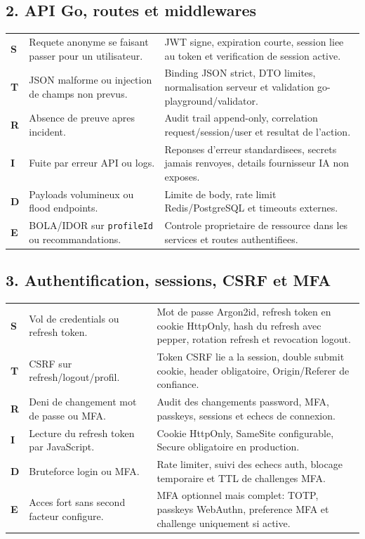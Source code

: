 \documentclass[10pt,a4paper]{article}
\begin{document}
\subsection{2. API Go, routes et middlewares}
\begin{tabularx}{\textwidth}{@{}L{1.6cm}L{4.2cm}Y@{}}
\toprule
\textbf{S} & Requete anonyme se faisant passer pour un utilisateur. & JWT signe, expiration courte, session liee au token et verification de session active. \\
\textbf{T} & JSON malforme ou injection de champs non prevus. & Binding JSON strict, DTO limites, normalisation serveur et validation go-playground/validator. \\
\textbf{R} & Absence de preuve apres incident. & Audit trail append-only, correlation request/session/user et resultat de l'action. \\
\textbf{I} & Fuite par erreur API ou logs. & Reponses d'erreur standardisees, secrets jamais renvoyes, details fournisseur IA non exposes. \\
\textbf{D} & Payloads volumineux ou flood endpoints. & Limite de body, rate limit Redis/PostgreSQL et timeouts externes. \\
\textbf{E} & BOLA/IDOR sur \texttt{profileId} ou recommandations. & Controle proprietaire de ressource dans les services et routes authentifiees. \\
\bottomrule
\end{tabularx}

\subsection{3. Authentification, sessions, CSRF et MFA}
\begin{tabularx}{\textwidth}{@{}L{1.6cm}L{4.2cm}Y@{}}
\toprule
\textbf{S} & Vol de credentials ou refresh token. & Mot de passe Argon2id, refresh token en cookie HttpOnly, hash du refresh avec pepper, rotation refresh et revocation logout. \\
\textbf{T} & CSRF sur refresh/logout/profil. & Token CSRF lie a la session, double submit cookie, header obligatoire, Origin/Referer de confiance. \\
\textbf{R} & Deni de changement mot de passe ou MFA. & Audit des changements password, MFA, passkeys, sessions et echecs de connexion. \\
\textbf{I} & Lecture du refresh token par JavaScript. & Cookie HttpOnly, SameSite configurable, Secure obligatoire en production. \\
\textbf{D} & Bruteforce login ou MFA. & Rate limiter, suivi des echecs auth, blocage temporaire et TTL de challenges MFA. \\
\textbf{E} & Acces fort sans second facteur configure. & MFA optionnel mais complet: TOTP, passkeys WebAuthn, preference MFA et challenge uniquement si active. \\
\bottomrule
\end{tabularx}
\end{document}
